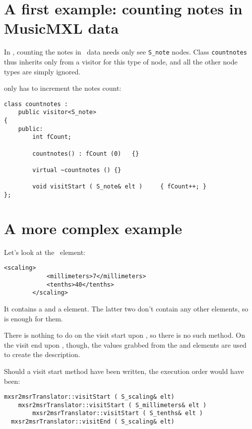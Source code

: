 \section{A first example: counting notes in MusicMXL data}

In , counting the notes in \mxml\ data needs only see {\tt S_note} nodes. Class {\tt countnotes} thus inherits only from a visitor for this type of node, and all the other node types are simply ignored.

 only has to increment the notes count:
\begin{lstlisting}[language=CPlusPlus,caption={\libmusicxmlsamples{countnotes.cpp}}]
class countnotes :
	public visitor<S_note>
{
	public:
		int	fCount;

		countnotes() : fCount (0)	{}

		virtual ~countnotes () {}

		void visitStart ( S_note& elt )		{ fCount++; }
};
\end{lstlisting}

\section{A more complex example}

Let's look at the  \mxml\ element:
\begin{lstlisting}[language=MusicXML]
		<scaling>
			<millimeters>7</millimeters>
			<tenths>40</tenths>
		</scaling>
\end{lstlisting}

It contains a  and a  element. The latter two don't contain any other elements, so  is enough for them.

There is nothing to do on the visit start upon , so there is no such method.
On the visit end upon , though, the values grabbed from the  and  elements are used to create the  description.

Should a visit start method have been written, the execution order would have been:
\begin{lstlisting}[language=CPlusPlus]
  mxsr2msrTranslator::visitStart ( S_scaling& elt)
  	mxsr2msrTranslator::visitStart ( S_millimeters& elt )
		mxsr2msrTranslator::visitStart ( S_tenths& elt )
  mxsr2msrTranslator::visitEnd ( S_scaling& elt)
\end{lstlisting}

